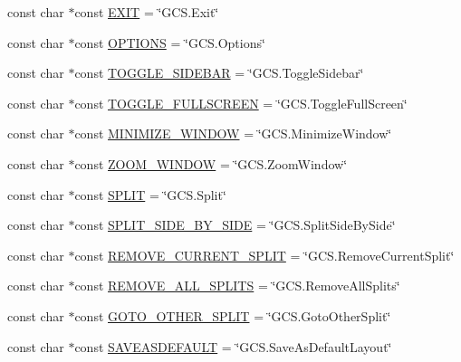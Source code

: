 \begin{DoxyCompactItemize}
const char $\ast$const \hyperlink{group___core_plugin_ga83e07a95322a89ce775c68835ba44e76}{\-E\-X\-I\-T} = \char`\"{}\-G\-C\-S.\-Exit\char`\"{}
\item 
const char $\ast$const \hyperlink{group___core_plugin_ga267bcce339e88888bc0201263e9bbdfb}{\-O\-P\-T\-I\-O\-N\-S} = \char`\"{}\-G\-C\-S.\-Options\char`\"{}
\item 
const char $\ast$const \hyperlink{group___core_plugin_ga5666d7d0dd9fe17d3391329dce26f2ae}{\-T\-O\-G\-G\-L\-E\-\_\-\-S\-I\-D\-E\-B\-A\-R} = \char`\"{}\-G\-C\-S.\-Toggle\-Sidebar\char`\"{}
\item 
const char $\ast$const \hyperlink{group___core_plugin_gaf42c8b03a52e53fbdc3a6f8c014230e8}{\-T\-O\-G\-G\-L\-E\-\_\-\-F\-U\-L\-L\-S\-C\-R\-E\-E\-N} = \char`\"{}\-G\-C\-S.\-Toggle\-Full\-Screen\char`\"{}
\item 
const char $\ast$const \hyperlink{group___core_plugin_ga1bec24c27ebb317beb5bd728f2695a32}{\-M\-I\-N\-I\-M\-I\-Z\-E\-\_\-\-W\-I\-N\-D\-O\-W} = \char`\"{}\-G\-C\-S.\-Minimize\-Window\char`\"{}
\item 
const char $\ast$const \hyperlink{group___core_plugin_gac48fb1ea972baf7b49dd3cc7f7306abe}{\-Z\-O\-O\-M\-\_\-\-W\-I\-N\-D\-O\-W} = \char`\"{}\-G\-C\-S.\-Zoom\-Window\char`\"{}
\item 
const char $\ast$const \hyperlink{group___core_plugin_gac606ab3edf11d3377855b39076879af2}{\-S\-P\-L\-I\-T} = \char`\"{}\-G\-C\-S.\-Split\char`\"{}
\item 
const char $\ast$const \hyperlink{group___core_plugin_gabececa23956bc46634779f4abbb9bad9}{\-S\-P\-L\-I\-T\-\_\-\-S\-I\-D\-E\-\_\-\-B\-Y\-\_\-\-S\-I\-D\-E} = \char`\"{}\-G\-C\-S.\-Split\-Side\-By\-Side\char`\"{}
\item 
const char $\ast$const \hyperlink{group___core_plugin_ga333ed74b9c4600e73641e017ff527e10}{\-R\-E\-M\-O\-V\-E\-\_\-\-C\-U\-R\-R\-E\-N\-T\-\_\-\-S\-P\-L\-I\-T} = \char`\"{}\-G\-C\-S.\-Remove\-Current\-Split\char`\"{}
\item 
const char $\ast$const \hyperlink{group___core_plugin_ga88a3d0898a8b11873092cedcbac1d981}{\-R\-E\-M\-O\-V\-E\-\_\-\-A\-L\-L\-\_\-\-S\-P\-L\-I\-T\-S} = \char`\"{}\-G\-C\-S.\-Remove\-All\-Splits\char`\"{}
\item 
const char $\ast$const \hyperlink{group___core_plugin_ga615e7fc83cead9cfc1d43aa8b748a688}{\-G\-O\-T\-O\-\_\-\-O\-T\-H\-E\-R\-\_\-\-S\-P\-L\-I\-T} = \char`\"{}\-G\-C\-S.\-Goto\-Other\-Split\char`\"{}
\item 
const char $\ast$const \hyperlink{group___core_plugin_gae5ad60fb00f57b64928e1751953d23f7}{\-S\-A\-V\-E\-A\-S\-D\-E\-F\-A\-U\-L\-T} = \char`\"{}\-G\-C\-S.\-Save\-As\-Default\-Layout\char`\"{}

\end{DoxyCompactItemize}
